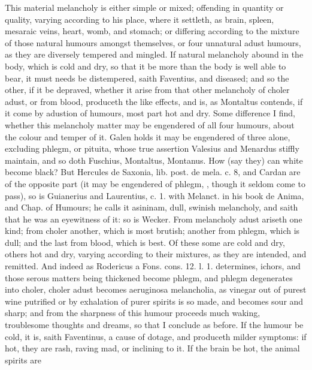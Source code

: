 {{This material melancholy is either simple or mixed; offending in
quantity or quality, varying according to his place, where it settleth,
as brain, spleen, mesaraic veins, heart, womb, and stomach; or
differing according to the mixture of those natural humours amongst
themselves, or four unnatural adust humours, as they are diversely
tempered and mingled. If natural melancholy abound in the body, which
is cold and dry, so that it be more than the body is well able to
bear, it must needs be distempered, saith Faventius, and diseased; and
so the other, if it be depraved, whether it arise from that other
melancholy of choler adust, or from blood, produceth the like effects,
and is, as Montaltus contends, if it come by adustion of humours, most
part hot and dry. Some difference I find, whether this melancholy
matter may be engendered of all four humours, about the colour and
temper of it. Galen holds it may be engendered of three alone,
excluding phlegm, or pituita, whose true assertion Valesius and
Menardus stiffly maintain, and so doth Fuschius, Montaltus, Montanus. How (say they) can white become black? But Hercules de
Saxonia, lib. post. de mela. c. 8, and Cardan are of the opposite
part (it may be engendered of phlegm, , though it
seldom come to pass), so is Guianerius and Laurentius, c. 1. with
Melanct. in his book de Anima, and Chap. of Humours; he calls it
asininam, dull, swinish melancholy, and saith that he was an eyewitness
of it: so is Wecker. From melancholy adust ariseth one kind; from
choler another, which is most brutish; another from phlegm, which is
dull; and the last from blood, which is best. Of these some are cold
and dry, others hot and dry, varying according to their mixtures,
as they are intended, and remitted. And indeed as Rodericus a Fons.
cons. 12. l. 1. determines, ichors, and those serous matters being
thickened become phlegm, and phlegm degenerates into choler, choler
adust becomes aeruginosa melancholia, as vinegar out of purest wine
putrified or by exhalation of purer spirits is so made, and becomes
sour and sharp; and from the sharpness of this humour proceeds much
waking, troublesome thoughts and dreams, \etc{} so that I conclude as
before. If the humour be cold, it is, saith Faventinus, a cause
of dotage, and produceth milder symptoms: if hot, they are rash, raving
mad, or inclining to it. If the brain be hot, the animal spirits are
}}
